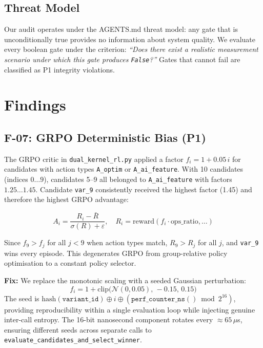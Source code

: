 \documentclass[10pt,twocolumn]{article}
\begin{document}
\subsection{Threat Model}

Our audit operates under the AGENTS.md threat model: any gate that is
unconditionally true provides no information about system quality.  We
evaluate every boolean gate under the criterion:
\emph{``Does there exist a realistic measurement scenario under which this gate
produces \texttt{False}?''}
Gates that cannot fail are classified as P1 integrity violations.

\section{Findings}

\subsection{F-07: GRPO Deterministic Bias (P1)}

The GRPO critic in \texttt{dual\_kernel\_rl.py} applied a factor
$f_i = 1 + 0.05\,i$ for candidates with action types
\texttt{A\_optim} or \texttt{A\_ai\_feature}.  With 10 candidates (indices
$0\ldots9$), candidates 5--9 all belonged to \texttt{A\_ai\_feature} with
factors $1.25\ldots1.45$.  Candidate \texttt{var\_9} consistently received the
highest factor (1.45) and therefore the highest GRPO advantage:

\begin{equation}
A_i = \frac{R_i - \bar{R}}{\sigma(R) + \varepsilon}, \quad
R_i = \text{reward}(f_i \cdot \text{ops\_ratio}, \ldots)
\end{equation}

Since $f_9 > f_j$ for all $j < 9$ when action types match, $R_9 > R_j$ for
all $j$, and \texttt{var\_9} wins every episode.  This degenerates GRPO from
group-relative policy optimisation to a constant policy selector.

\textbf{Fix:} We replace the monotonic scaling with a seeded Gaussian
perturbation:
\begin{equation}
f_i = 1 + \text{clip}\bigl(\mathcal{N}(0, 0.05),\, -0.15,\, 0.15\bigr)
\end{equation}
The seed is $\text{hash}(\texttt{variant\_id}) \oplus i \oplus
(\texttt{perf\_counter\_ns}() \bmod 2^{16})$, providing reproducibility
within a single evaluation loop while injecting genuine inter-call entropy.
The 16-bit nanosecond component rotates every $\approx65\,\mu$s, ensuring
different seeds across separate calls to \texttt{evaluate\_candidates\_and\_select\_winner}.
\end{document}
